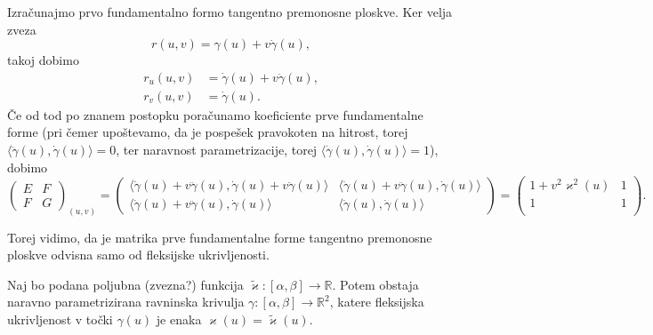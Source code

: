 Izračunajmo prvo fundamentalno formo tangentno premonosne ploskve. Ker velja zveza
\begin{equation*} r(u,v) = \gamma(u) + v \dot{\gamma}(u),\end{equation*}takoj dobimo 
\begin{align*}
    r_u(u,v) &= \dot{\gamma}(u) + v \ddot{\gamma}(u), \\
    r_v(u,v) &= \dot{\gamma}(u). 
\end{align*}
Če od tod po znanem postopku poračunamo koeficiente prve fundamentalne forme (pri čemer upoštevamo, da je pospešek pravokoten na hitrost, torej $ \langle \ddot{\gamma}(u) , \dot{\gamma}(u) \rangle = 0$, ter naravnost parametrizacije, torej $ \langle \dot{\gamma}(u) , \dot{\gamma}(u) \rangle = 1$), dobimo 
\begin{equation*} \begin{pmatrix}
E & F \\
F & G
\end{pmatrix}_{(u,v)} = \begin{pmatrix}
  \langle \dot{\gamma}(u) + v \ddot{\gamma}(u), \dot{\gamma}(u) + v \ddot{\gamma}(u) \rangle  & \langle \dot{\gamma}(u) + v \ddot{\gamma}(u), \dot{\gamma}(u) \rangle \\
  \langle \dot{\gamma}(u) + v \ddot{\gamma}(u), \dot{\gamma}(u) \rangle & \langle \dot{\gamma}(u), \dot{\gamma}(u) \rangle
  \end{pmatrix}= \begin{pmatrix}
  1 + v^2 \varkappa^2(u) & 1\\
  1 & 1\\
\end{pmatrix}.\end{equation*}

Torej vidimo, da je matrika prve fundamentalne forme tangentno premonosne ploskve odvisna samo od fleksijske ukrivljenosti.

\begin{trditev}
\label{trd_obstoj_krivulje_glede_na_funkcijo_fleksijske_ukrivljenosti}
 Naj bo podana poljubna (zvezna?) funkcija $\tilde{\varkappa}: [\alpha, \beta] \to  \mathbb{R}$. Potem obstaja naravno parametrizirana ravninska krivulja $\gamma: [\alpha, \beta] \to  \mathbb{R}^2$, katere fleksijska ukrivljenost v točki
  $\gamma(u)$ je enaka $\varkappa(u) = \tilde{\varkappa}(u)$.
\end{trditev}

